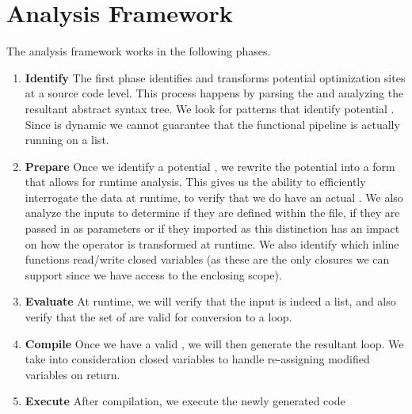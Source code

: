 \section{Analysis Framework}

The \javascript analysis framework works in the following phases.  
\begin{enumerate}
  \item \textbf{Identify} The first phase identifies and transforms potential optimization sites at a source code level.  This process happens by parsing   the \javascript and analyzing the resultant abstract syntax tree.  We look for patterns that identify potential \pipelines.  Since \javascript is dynamic we cannot guarantee that the functional pipeline is actually running on a list.
  \item \textbf{Prepare} Once we identify a potential \pipeline, we rewrite the potential \pipeline into a form that allows for runtime analysis.  This gives us the ability to efficiently interrogate the data at runtime, to verify that we do have an actual \pipeline.  We also analyze the \pipelineoperator inputs to determine if they are defined within the file, if they are passed in as parameters or if they imported as this distinction has an impact on how the operator is transformed at runtime.  We also identify which inline functions read/write closed variables (as these are the only closures we can support since we have access to the enclosing scope).
  \item \textbf{Evaluate} At runtime, we will verify that the input is indeed a list, and also verify that the set of \pipelineoperators are valid for conversion to a  loop.  
  \item \textbf{Compile} Once we have a valid \pipeline, we will then generate the resultant  loop.  We take into consideration closed variables to handle re-assigning modified variables on return.   
  \item \textbf{Execute} After compilation, we execute the newly generated code  
\end{enumerate}

